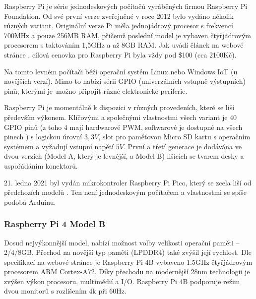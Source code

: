 Raspberry Pi je série jednodeskových počítačů vyráběných firmou Raspberry Pi Foundation. Od své první verze zveřejněné v roce 2012 bylo vydáno několik různých variant. Originální verze Pi měla jednojádrový procesor s frekvencí 700MHz a pouze 256MB RAM, přičemž poslední model je vybaven čtyřjádrovým procesorem s taktováním 1,5GHz a až 8GB RAM. Jak uvádí článek na webové stránce \cite{rpiOpenSource}, cílová cenovka pro Raspberry Pi byla vždy pod \$100 (cca 2100Kč).

Na tomto levném počítači běží operační systém Linux nebo Windows IoT (u novějších verzí). Mimo to nabízí sérii GPIO (univerzálních vstupně výstupních) pinů, kterými je~možno připojit různé elektronické periferie.

Raspberry Pi je momentálně k dispozici v různých provedeních, které se liší především výkonem. Klíčovými a společnými vlastnostmi všech variant je 40 GPIO pinů (z toho 4 mají hardwarové PWM, softwarové je dostupné na všech pinech \cite{rpiGPIO}) s logickou úrovní $3,3V$, slot pro paměťovou Micro SD kartu s operačním systémem a vyžadují vstupní napětí $5V$. První a třetí generace je dodávána ve dvou verzích (Model A, který je levnější, a Model B) lišících se tvarem desky a uspořádáním konektorů.

21. ledna 2021 byl vydán mikrokontroler Raspberry Pi Pico, který se zcela liší od předchozích modelů \cite{rpiSocialCompare}. Ten není jednodeskovým počítačem a vlastnostmi se spíše podobá Arduinu.

\subsubsection*{Raspberry Pi 4 Model B}
Dosud nejvýkonnější model, nabízí možnost volby velikosti operační paměti -- 2/4/8GB. Přechod na novější typ paměti (LPDDR4) také zvýšil její rychlost. Dle specifikací na webové stránce \cite{rpi4b} je Raspberry Pi 4B vybaveno 1.5GHz čtyřjádrovým procesorem ARM Cortex-A72. Díky přechodu na modernější 28nm technologii je zvýšen výkon procesoru, multimédií a I/O. Raspberry Pi 4B podporuje režim dvou monitorů s rozlišením 4k při 60Hz.

